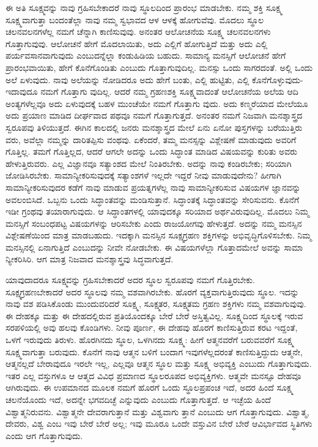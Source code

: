 ಈ ಅತಿ ಸೂಕ್ಷ್ಮವನ್ನು ನಾವು ಗ್ರಹಿಸಬೇಕಾದರೆ ನಾವು ಸ್ಥೂಲದಿಂದ ಪ್ರಾರಂಭ ಮಾಡಬೇಕು. ನಮ್ಮ ಶಕ್ತಿ ಸೂಕ್ಷ್ಮ ಸೂಕ್ಷ್ಮವಾಗುತ್ತಾ ಬಂದಂತೆಲ್ಲಾ ನಾವು ನಮ್ಮ ಸ್ವಭಾವದ ಆಳ ಆಳಕ್ಕೆ ಹೋಗುವೆವು. ಮೊದಲು ಸ್ಥೂಲ ಚಲನವಲನಗಳೆಲ್ಲ ನಮಗೆ ಚೆನ್ನಾಗಿ ಕಾಣಿಸುವುವು. ಅನಂತರ ಆಲೋಚನೆಯ ಸೂಕ್ಷ್ಮ ಚಲನವಲನಗಳು ಗೊತ್ತಾಗುವುವು. ಆಲೋಚನೆ ಹೇಗೆ ಮೊದಲಾಯಿತು, ಅದು ಎಲ್ಲಿಗೆ ಹೋಗುತ್ತಿದೆ ಮತ್ತು ಅದು ಎಲ್ಲಿ ಪರ್ಯವಸಾನವಾಗುವುದು ಎಂಬುದನ್ನೆಲ್ಲಾ ಕಂಡುಹಿಡಿಯ ಬಹುದು. ಸಾಮಾನ್ಯ ಮನಸ್ಸಿಗೆ ಆಲೋಚನೆ ಹೇಗೆ ಪ್ರಾರಂಭವಾಯಿತು, ಹೇಗೆ ಕೊನೆಗೊಂಡಿತು ಎಂಬುದು ಗೊತ್ತಾಗುವುದಿಲ್ಲ. ಮನಸ್ಸು ಒಂದು ಸಾಗರದಂತೆ. ಅಲ್ಲಿ ಒಂದು ಅಲೆ ಏಳುವುದು. ನಾವು ಅಲೆಯನ್ನು ನೋಡಿದರೂ ಅದು ಹೇಗೆ ಬಂತು, ಎಲ್ಲಿ ಹುಟ್ಟಿತು, ಎಲ್ಲಿ ಕೊನೆಗೊಳ್ಳುವುದು-ಇದಾವುದೂ ನಮಗೆ ಗೊತ್ತಾಗು ವುದಿಲ್ಲ. ಆದರೆ ನಮ್ಮ ಗ್ರಹಣಶಕ್ತಿ ಸೂಕ್ಷ್ಮವಾದಂತೆ ಆಲೋಚನೆಯ ಅಲೆಯ ಆದಿ ಅಂತ್ಯಗಳೆಲ್ಲವೂ ಅದು ಏಳುವುದಕ್ಕೆ ಬಹಳ ಮುಂಚೆಯೇ ನಮಗೆ ಗೊತ್ತಾಗು ವುದು. ಅದು ಕಣ್ಮರೆಯಾದ ಮೇಲೆಯೂ ಅದು ಪ್ರಯಾಣ ಮಾಡಿದ ದೀರ್ಘವಾದ ಪಥವೂ ನಮಗೆ ಗೊತ್ತಾಗುತ್ತದೆ. ಅನಂತರ ನಮಗೆ ನಿಜವಾಗಿ ಮನಶ್ಶಾಸ್ತ್ರದ ಸ್ವರೂಪವು ತಿಳಿಯುತ್ತದೆ. ಈಗಿನ ಕಾಲದಲ್ಲಿ ಜನರು ಮನಶ್ಶಾಸ್ತ್ರದ ಮೇಲೆ ಏನು ಏನೋ ಪುಸ್ತಗಳನ್ನು ಬರೆಯುತ್ತಿರು ವರು, ಅವೆಲ್ಲಾ ನಮ್ಮನ್ನು ದಾರಿತಪ್ಪಿಸು ವಂಥವು. ಏಕೆಂದರೆ, ತಮ್ಮ ಮನಸ್ಸನ್ನು ವಿಶ್ಲೇಷಣೆ ಮಾಡುವುದು ಅವರಿಗೆ ಗೊತ್ತಿಲ್ಲ. ತಮಗೆ ಗೊತ್ತಿಲ್ಲದ, ಆದರೆ ಆಗಲೇ ಅದನ್ನು ಒಂದು ಸಿದ್ಧಾಂತ ಮಾಡಿದ ವಿಷಯವನ್ನು ಕುರಿತು ಅವರು ಹೇಳುತ್ತಿರುವರು. ಎಲ್ಲ ವಿಜ್ಞಾನವೂ ಸತ್ಯಾಂಶದ ಮೇಲೆ ನಿಂತಿರಬೇಕು. ಅದನ್ನು ನಾವು ಕಂಡಿರಬೇಕು; ಸರಿಯಾಗಿ ಜೋಡಿಸಿರಬೇಕು. ಸಾಮಾನ್ಯೀಕರಿಸುವುದಕ್ಕೆ ಸತ್ಯಾಂಶಗಳೆ ಇಲ್ಲದೇ ಇದ್ದರೆ ನೀವು ಮಾಡುವುದೇನು? ಹೀಗಾಗಿ ಸಾಮಾನ್ಯೀಕರಿಸುವುದರ ಕಡೆಗೆ ನಾವು ಮಾಡುವ ಪ್ರಯತ್ನಗಳೆಲ್ಲ ನಾವು ಸಾಮಾನ್ಯೀಕರಿಸುವ ವಿಷಯಗಳ ಜ್ಞಾನವನ್ನು ಅವಲಂಬಿಸಿದೆ. ಒಬ್ಬನು ಒಂದು ಸಿದ್ಧಾಂತವನ್ನು ಮಂಡಿಸುತ್ತಾನೆ. ಸಿದ್ಧಾಂತಕ್ಕೆ ಸಿದ್ಧಾಂತವನ್ನು ಸೇರಿಸುವನು. ಕೊನೆಗೆ ಇಡೀ ಗ್ರಂಥವು ತಯಾರಾಗುವುದು. ಆ ಸಿದ್ಧಾಂತಗಳಲ್ಲಿ ಯಾವುದಕ್ಕೂ ಸರಿಯಾದ ಅರ್ಥವಿರುವುದಿಲ್ಲ. ಮೊದಲು ನಿಮ್ಮ ಮನಸ್ಸಿಗೆ ಸಂಬಂಧಪಟ್ಟ ವಿಷಯಗಳನ್ನು ಆರಿಸಬೇಕು ಎಂದು ರಾಜಯೋಗವು ಹೇಳುತ್ತದೆ. ಅದನ್ನು ನಮ್ಮ ಮನಸ್ಸಿನ ವಿಶ್ಲೇಷಣೆಯಿಂದ ಮಾತ್ರ ಮಾಡಬಹುದು. ಇದಕ್ಕಾಗಿ ಮನಸ್ಸಿನ ಸೂಕ್ಷ್ಮಗ್ರಹಣ ಶಕ್ತಿಗಳನ್ನು ಅಭಿವೃದ್ಧಿಗೊಳಿಸಬೇಕು. ನಿಮ್ಮ ಮನಸ್ಸಿನಲ್ಲಿ ಏನಾಗುತ್ತಿದೆ ಎಂಬುದನ್ನು ನೀವೇ ನೋಡಬೇಕು. ಈ ವಿಷಯಗಳೆಲ್ಲಾ ಗೊತ್ತಾದಮೇಲೆ ಅವನ್ನು ಸಾಮಾ ನ್ಯೀಕರಿಸಿರಿ. ಆಗ ಮಾತ್ರ ನಿಜವಾದ ಮನಶ್ಶಾಸ್ತ್ರವು ಸಿದ್ಧವಾಗುತ್ತದೆ.

ಯಾವುದಾದರೂ ಸೂಕ್ಷ್ಮವನ್ನು ಗ್ರಹಿಸಬೇಕಾದರೆ ಅದರ ಸ್ಥೂಲ ಸ್ವರೂಪವು ನಮಗೆ ಗೊತ್ತಿರಬೇಕು. ಸೂಕ್ಷ್ಮಗ್ರಹಣಬೇಕಾದರೆ ಅದರ ಸ್ಥೂಲವು ನಮ್ಮ ವಶವಾಗಿರಬೇಕು. ಹೊರಗೆ ವ್ಯಕ್ತವಾಗುತ್ತಿರುವುದು ಸ್ಥೂಲ. ಇದನ್ನು ನಾವು ವಶ ಪಡಿಸಿಕೊಂಡು ಮುಂದುವರಿದರೆ ಸೂಕ್ಷ್ಮ, ಸೂಕ್ಷ್ಮತರ, ಸೂಕ್ಷ್ಮತಮ ಗ್ರಹಣ ಶಕ್ತಿಗಳು ನಮ್ಮ ವಶವಾಗುವುವು. ಈ ದೇಹಕ್ಕೂ ಮತ್ತು ಈ ದೇಹದಲ್ಲಿರುವ ಪ್ರತಿಯೊಂದಕ್ಕೂ ಬೇರೆ ಬೇರೆ ಅಸ್ತಿತ್ವವಿಲ್ಲ. ಸೂಕ್ಷ್ಮದಿಂದ ಸ್ಥೂಲಕ್ಕೆ ಇರುವ ಸರಪಳಿಯಲ್ಲಿ ಅವು ಹಲವು ಕೊಂಡಿಗಳು. ನೀವು ಪೂರ್ಣ, ಈ ದೇಹವು ಹೊರಗೆ ಕಾಣಿಸುತ್ತಿರುವ ಕರಟ ಇದ್ದಂತೆ, ಒಳಗೆ ಇರುವುದು ತಿರುಳು. ಹೊರಗಿನದು ಸ್ಥೂಲ, ಒಳಗಿನದು ಸೂಕ್ಷ್ಮ: ಹೀಗೆ ಆತ್ಮನವರೆಗೆ ಬರುವವರೆಗೆ ಸೂಕ್ಷ್ಮ ಸೂಕ್ಷ್ಮವಾಗುತ್ತಾ ಬರುವುದು. ಕೊನೆಗೆ ನಾವು ಆತ್ಮನ ಬಳಿಗೆ ಬಂದಾಗ ಇವುಗಳೆಲ್ಲದರಂತೆ ಕಾಣಿಸುತ್ತಿದ್ದುದು ಆತ್ಮನೇ, ಆತ್ಮನಲ್ಲದೆ ಬೇರಾವುದೂ ಇರಲೇ ಇಲ್ಲ, ಎಲ್ಲವೂ ಆತ್ಮನ ಸ್ಥೂಲ ಮತ್ತು ಸೂಕ್ಷ್ಮ ಅಭಿವ್ಯಕ್ತಿ ಎಂಬುದು ಗೊತ್ತಾಗುವುದು. ಇತರ ಎಲ್ಲ ವಸ್ತುಗಳೂ ಆ ಆತ್ಮದ ವಿವಿಧ ಪ್ರಮಾಣದ ಸ್ಥೂಲರೂಪದ ಅಭಿವ್ಯಕ್ತಿಗಳು. ಆತ್ಮವೇ ಮನಸ್ಸೂ ದೇಹವೂ ಆಗಿರುವುದು. ಈ ಉಪಮಾನದ ಮೂಲಕ ನಮಗೆ ಹೊರಗೆ ಒಂದು ಸ್ಥೂಲಪ್ರಪಂಚ ಇದೆ, ಅದರ ಹಿಂದೆ ಸೂಕ್ಷ್ಮ ಚಲನೆಯೊಂದು ಇದೆ, ಅದನ್ನೇ ಭಗವದಿಚ್ಛೆ ಎನ್ನುವುದು ಎಂಬುದು ಗೊತ್ತಾಗುತ್ತದೆ. ಆ ಇಚ್ಛೆಯ ಹಿಂದೆ ವಿಶ್ವಾತ್ಮನಿರುವನು. ವಿಶ್ವಾತ್ಮನೇ ದೇವರಾಗುತ್ತಾನೆ ಮತ್ತು ವಿಶ್ವವಾಗು ತ್ತಾನೆ ಎಂಬುದು ಆಗ ಗೊತ್ತಾಗುವುದು. ವಿಶ್ವಾತ್ಮ, ದೇವರು, ವಿಶ್ವ ಎಂಬ ಇವು ಬೇರೆ ಬೇರೆ ಅಲ್ಲ; ಇವು ಮೂರೂ ಒಂದೇ ವಸ್ತುವಿನ ಬೇರೆ ಬೇರೆ ಆವಿರ್ಭಾವದ ಸ್ಥಿತಿಗಳು ಎಂದು ಆಗ ಗೊತ್ತಾಗುವುದು.

